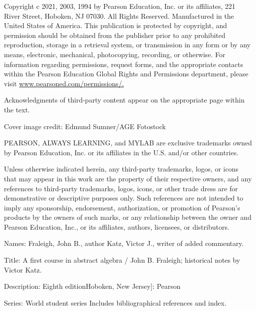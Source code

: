 \documentclass[11pt,oneside]{article}
\begin{document}
\begin{BookBody}

\footnotesize

\noindent Copyright \BookInline{\text{\copyright} }c 2021, 2003, 1994 by Pearson Education, Inc. or its affiliates, 221 River Street, Hoboken, NJ 07030. All Rights Reserved. Manufactured in the United States of America. This publication is protected by copyright, and permission should be obtained from the publisher prior to any prohibited reproduction, storage in a retrieval system, or transmission in any form or by any means, electronic, mechanical, photocopying, recording, or otherwise. For information regarding permissions, request forms, and the appropriate contacts within the Pearson Education Global Rights and Permissions department, please visit \url{www.pearsoned.com/permissions/.}

\noindent Acknowledgments of third-party content appear on the appropriate page within the text.

\noindent Cover image credit: Edmund Sumner/AGE Fotostock

\noindent PEARSON, ALWAYS LEARNING, and MYLAB are exclusive trademarks owned by Pearson Education, Inc. or its affiliates in the U.S. and/or other countries.

\noindent Unless otherwise indicated herein, any third-party trademarks, logos, or icons that may appear in this work are the property of their respective owners, and any references to third-party trademarks, logos, icons, or other trade dress are for demonstrative or descriptive purposes only. Such references are not intended to imply any sponsorship, endorsement, authorization, or promotion of Pearson’s products by the owners of such marks, or any relationship between the owner and Pearson Education, Inc., or its affiliates, authors, licensees, or distributors.


\noindent Names: Fraleigh, John B., author Katz, Victor J., writer of added commentary.

\noindent Title: A first course in abstract algebra / John B. Fraleigh; historical notes by Victor Katz.

\noindent Description: Eighth edition\BookInline{.|[}Hoboken, New Jersey]: Pearson\BookInline{,\allowbreak [2021]|}

\noindent Series: World student series \BookInline{|} Includes bibliographical references and index.


\end{BookBody}
\end{document}
